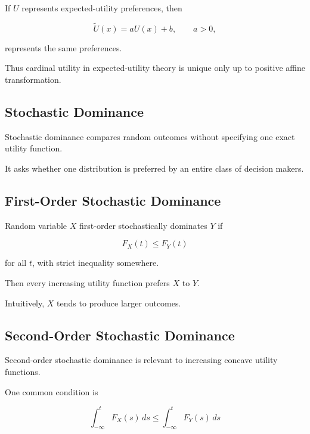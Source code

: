 If \(U\) represents expected-utility preferences, then

\[
\boxed{
\widetilde{U}(x)
=
aU(x)+b,
\qquad
a>0,
}
\]

represents the same preferences.

Thus cardinal utility in expected-utility theory is unique only up to
positive affine transformation.

\subsection{Stochastic Dominance}
\label{subsec:stochastic-dominance}

Stochastic dominance compares random outcomes without specifying one exact
utility function.

It asks whether one distribution is preferred by an entire class of
decision makers.

\subsection{First-Order Stochastic Dominance}
\label{subsec:first-order-stochastic-dominance}

Random variable \(X\) first-order stochastically dominates \(Y\) if

\[
\boxed{
F_X(t)
\leq
F_Y(t)
}
\]

for all \(t\), with strict inequality somewhere.

Then every increasing utility function prefers \(X\) to \(Y\).

Intuitively, \(X\) tends to produce larger outcomes.

\subsection{Second-Order Stochastic Dominance}
\label{subsec:second-order-stochastic-dominance}

Second-order stochastic dominance is relevant to increasing concave utility
functions.

One common condition is

\[
\boxed{
\int_{-\infty}^{t}
F_X(s)\,ds
\leq
\int_{-\infty}^{t}
F_Y(s)\,ds
}
\]

